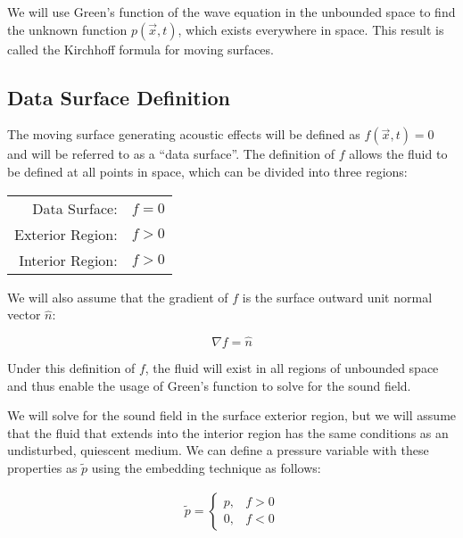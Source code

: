 \documentclass[]{aiaa-tc}%
\begin{document}
We will use Green’s function of the wave equation in the unbounded space to find the unknown function $p(\vec{x},t)$, which exists everywhere in space. This result is called the Kirchhoff formula for moving surfaces.


\subsection{Data Surface Definition}

The moving surface generating acoustic effects will be defined as $f(\vec{x},t) = 0$ and will be referred to as a ``data surface''.  The definition of $f$ allows the fluid to be defined at all points in space, which can be divided into three regions:

\begin{center}
\begin{tabular}{| r  l |}
  \hline
  Data Surface:    & $f=0$ \\
  Exterior Region: & $f>0$ \\
  Interior Region: & $f>0$ \\
  \hline
\end{tabular}
\end{center}

\noindent We will also assume that the gradient of $f$ is the surface outward unit normal vector $\hat{n}$:

\begin{equation} \label{Gradfnormal}
\nabla f = \hat{n}
\end{equation}

Under this definition of $f$, the fluid will exist in all regions of unbounded space and thus enable the usage of Green's function to solve for the sound field.

We will solve for the sound field in the surface exterior region, but we will assume that the fluid that extends into the interior region has the same conditions as an undisturbed, quiescent medium.  We can define a pressure variable with these properties as $\widetilde{p}$ using the embedding technique as follows:

\begin{equation} \label{Ptilde}
\begin{split}
\boxed{\widetilde{p} =
    \left\{ \begin{array}{lll}
        p, & f > 0 \\
        0, & f < 0
    \end{array} \right.}
\end{split}
\end{equation}
\end{document}
